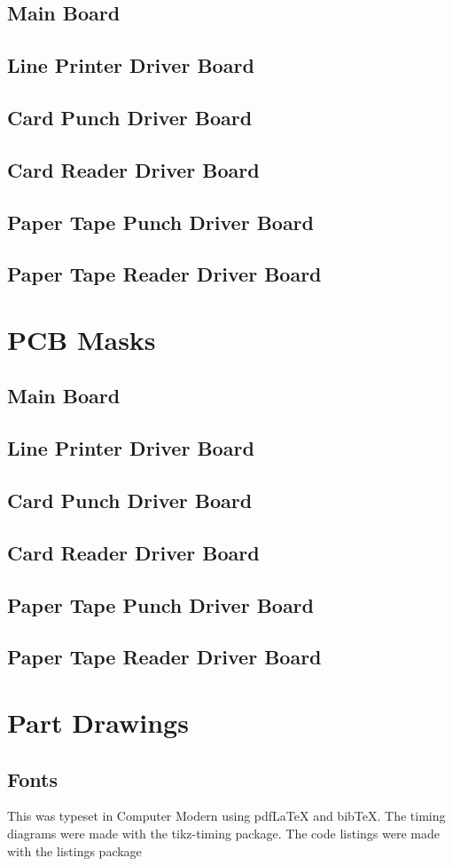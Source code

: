 \documentclass{book}
\begin{document}
\section{Main Board}
\cleardoublepage
\section{Line Printer Driver Board}
\cleardoublepage
\section{Card Punch Driver Board}
\cleardoublepage
\section{Card Reader Driver Board}
\cleardoublepage
\section{Paper Tape Punch Driver Board}
\cleardoublepage
\section{Paper Tape Reader Driver Board}
\chapter{PCB Masks}
\section{Main Board}
\cleardoublepage
\section{Line Printer Driver Board}
\cleardoublepage
\section{Card Punch Driver Board}
\cleardoublepage
\section{Card Reader Driver Board}
\cleardoublepage
\section{Paper Tape Punch Driver Board}
\cleardoublepage
\section{Paper Tape Reader Driver Board}
\chapter{Part Drawings}
\backmatter


\cleardoublepage
\section*{Fonts}
This was typeset in Computer Modern using pdf\LaTeX{} and bib\TeX{}.
The timing diagrams were made with the tikz-timing package.
The code listings were made with the listings package
\end{document}
